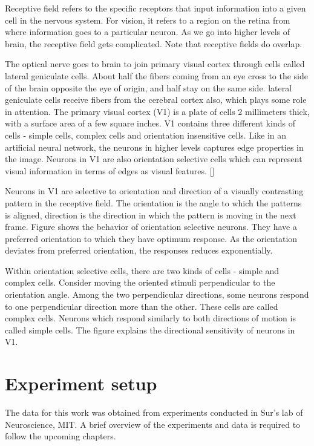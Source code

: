 \documentclass[MTech]{iitmdiss}
\begin{document}
Receptive field refers to the specific receptors that input information into a given cell in the nervous system. For vision, it refers to a region on the retina from where information goes to a particular neuron. As we go into higher levels of brain, the receptive field gets complicated. Note that receptive fields do overlap.

The optical nerve goes to brain to join primary visual cortex through cells called lateral geniculate cells. About half the fibers coming from an eye cross to the side of the brain opposite the eye of origin, and half stay on the same side. lateral geniculate cells receive fibers from the cerebral cortex also, which plays some role in attention. The primary visual cortex (V1) is a plate of cells 2 millimeters thick, with a surface area of a few square inches. V1 contains three different kinds of cells - simple cells, complex cells and orientation insensitive cells. Like in an artificial neural network, the neurons in higher levels captures edge properties in the image. Neurons in V1 are also orientation selective cells which can represent visual information in terms of edges as visual features. [\cite{hubel1995eye}]

Neurons in V1 are selective to orientation and direction of a visually contrasting pattern in the receptive field. The orientation is the angle to which the patterns is aligned, direction is the direction in which the pattern is moving in the next frame. Figure shows the behavior of orientation selective neurons. They have a preferred orientation to which they have optimum response. As the orientation deviates from preferred orientation, the responses reduces exponentially.

Within orientation selective cells, there are two kinds of cells - simple and complex cells. Consider moving the oriented stimuli perpendicular to the orientation angle. Among the two perpendicular directions, some neurons respond to one perpendicular direction more than the other. These cells are called complex cells. Neurons which respond similarly to both directions of motion is called simple cells. The figure explains the directional sensitivity of neurons in V1.
\section{Experiment setup} %
\label{sec:experiment_setup}
The data for this work was obtained from experiments conducted in Sur's lab of Neuroscience, MIT. A brief overview of the experiments and data is required to follow the upcoming chapters.
\end{document}
